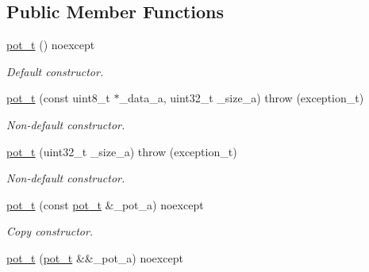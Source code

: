 \subsection*{Public Member Functions}
\begin{DoxyCompactItemize}
\item 
\hyperlink{class_n_h_1_1_protocols_1_1_raw_1_1pot__t_af086f3f10e88f3f906a0fd5c9901d4f1}{pot\+\_\+t} () noexcept
\begin{DoxyCompactList}\small\item\em Default constructor. \end{DoxyCompactList}\item 
\hyperlink{class_n_h_1_1_protocols_1_1_raw_1_1pot__t_a4c2c3964a61735786ec9e31b10524f7c}{pot\+\_\+t} (const uint8\+\_\+t $\ast$\+\_\+data\+\_\+a, uint32\+\_\+t \+\_\+size\+\_\+a)  throw (exception\+\_\+t)
\begin{DoxyCompactList}\small\item\em Non-\/default constructor. \end{DoxyCompactList}\item 
\hyperlink{class_n_h_1_1_protocols_1_1_raw_1_1pot__t_ae40dc98cefa4754adcd154928f5d6fe3}{pot\+\_\+t} (uint32\+\_\+t \+\_\+size\+\_\+a)  throw (exception\+\_\+t)
\begin{DoxyCompactList}\small\item\em Non-\/default constructor. \end{DoxyCompactList}\item 
\hypertarget{class_n_h_1_1_protocols_1_1_raw_1_1pot__t_a378d13cc9b400920d62cbc0edcbd08ef}{\hyperlink{class_n_h_1_1_protocols_1_1_raw_1_1pot__t_a378d13cc9b400920d62cbc0edcbd08ef}{pot\+\_\+t} (const \hyperlink{class_n_h_1_1_protocols_1_1_raw_1_1pot__t}{pot\+\_\+t} \&\+\_\+pot\+\_\+a) noexcept}\label{class_n_h_1_1_protocols_1_1_raw_1_1pot__t_a378d13cc9b400920d62cbc0edcbd08ef}

\begin{DoxyCompactList}\small\item\em Copy constructor. \end{DoxyCompactList}\item 
\hypertarget{class_n_h_1_1_protocols_1_1_raw_1_1pot__t_aadc3a3bd8e3d337b9c9cbde868cfb047}{\hyperlink{class_n_h_1_1_protocols_1_1_raw_1_1pot__t_aadc3a3bd8e3d337b9c9cbde868cfb047}{pot\+\_\+t} (\hyperlink{class_n_h_1_1_protocols_1_1_raw_1_1pot__t}{pot\+\_\+t} \&\&\+\_\+pot\+\_\+a) noexcept}\label{class_n_h_1_1_protocols_1_1_raw_1_1pot__t_aadc3a3bd8e3d337b9c9cbde868cfb047}


\end{DoxyCompactItemize}
